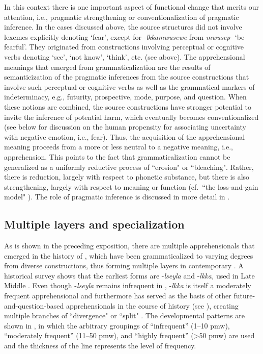 \documentclass[output=paper,colorlinks,citecolor=brown]{langscibook}
\begin{document}
In this context there is one important aspect of functional change that merits our attention, i.e., pragmatic strengthening or conventionalization of pragmatic inference. In the cases discussed above, the source structures did not involve lexemes explicitly denoting `fear', except for \nobreakdash-\textit{lkkamwusewe} from \textit{mwusep}- `be fearful'. They originated from constructions involving perceptual or cognitive verbs denoting `see', `not know', `think', etc. (see  above). The apprehensional meanings that emerged from grammaticalization are the results of semanticization of the pragmatic inferences from the source constructions that involve such perceptual or cognitive verbs as well as the grammatical markers of indeterminacy, e.g., futurity, prospective, mode, purpose, and question. When these notions are combined, the source constructions have stronger potential to invite the inference of potential harm, which eventually becomes conventionalized (see  below for discussion on the human propensity for associating uncertainty with negative emotion, i.e., fear). Thus, the acquisition of the apprehensional meaning proceeds from a more or less neutral to a negative meaning, i.e., apprehension. This points to the fact that grammaticalization cannot be generalized as a uniformly reductive process of ``erosion" or ``bleaching". Rather, there is reduction, largely with respect to phonetic substance, but there is also strengthening, largely with respect to meaning or function (cf.\ ``the loss-and-gain model" \citep[109--111]{HeineEtAl1991}). The role of pragmatic inference is discussed in more detail in .


\subsection{Multiple layers and specialization}
\label{subsec:layersandspec}

As is shown in the preceding exposition, there are multiple apprehensionals that emerged in the history of , which have been grammaticalized to varying degrees from diverse constructions, thus forming multiple layers in contemporary . A historical survey shows that the earliest forms are \nobreakdash-\textit{lseyla} and \nobreakdash-\textit{lkka,} used in Late Middle . Even though \nobreakdash-\textit{lseyla} remains infrequent in , \nobreakdash-\textit{lkka} is itself a moderately frequent apprehensional and furthermore has served as the basis of other future-and-question-based apprehensionals in the course of history (see ), creating multiple branches of ``divergence" \citep{Hopper1991} or ``split" \citep{HeineReh1984}. The developmental patterns are shown in , in which the arbitrary groupings of ``infrequent'' (1--10 pmw), ``moderately frequent'' (11--50 pmw), and ``highly frequent'' (>50 pmw) are used and the thickness of the line represents the level of frequency.
\end{document}
